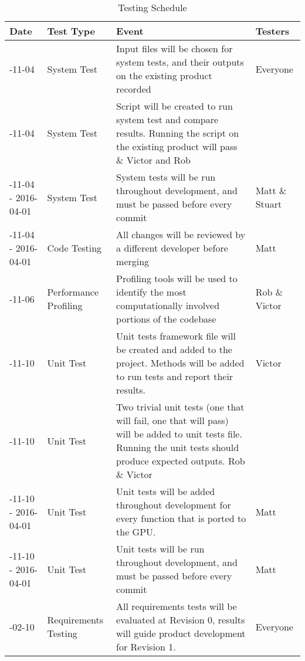 \documentclass[12pt]{article}
\begin{document}
\begin{center}
\begin{longtable}{>{\raggedright\arraybackslash}p{}>{\raggedright\arraybackslash}p{}>{\raggedright\arraybackslash}p{}
>{\raggedright\arraybackslash}p{}
}

\caption{Testing Schedule}\label{Table_Schedule}\\\toprule

\bf Date & \bf Test Type & \bf Event & \bf Testers\\\toprule
2015-11-04 & System Test & Input files will be chosen for system tests, and their outputs on the existing product recorded & Everyone \\\midrule
2015-11-04 & System Test & Script will be created to run system test and compare results. Running the script on the existing product will pass \& Victor and Rob\\\midrule
2015-11-04 - 2016-04-01 & System Test & System tests will be run throughout development, and must be passed before every commit & Matt \& Stuart\\\midrule
2015-11-04 - 2016-04-01 & Code Testing & All changes will be reviewed by a different developer before merging & Matt\\\midrule
2015-11-06 & Performance Profiling & Profiling tools will be used to identify the most computationally involved portions of the codebase & Rob \& Victor\\\midrule
2015-11-10 & Unit Test & Unit tests framework file will be created and added to the project. Methods will be added to run tests and report their results.& Victor \\\midrule
2016-11-10 & Unit Test & Two trivial unit tests (one that will fail, one that will pass) will be added to unit tests file. Running the unit tests should produce expected outputs. Rob \& Victor\\\midrule
2015-11-10 - 2016-04-01 & Unit Test & Unit tests will be added throughout development for every function that is ported to the GPU. & Matt\\\midrule
2015-11-10 - 2016-04-01 & Unit Test & Unit tests will be run throughout development, and must be passed before every commit & Matt\\\midrule
2016-02-10 & Requirements Testing & All requirements tests will be evaluated at Revision 0, results will guide product development for Revision 1. & Everyone\\

\bottomrule
\end{longtable}
\end{center}
\end{document}
